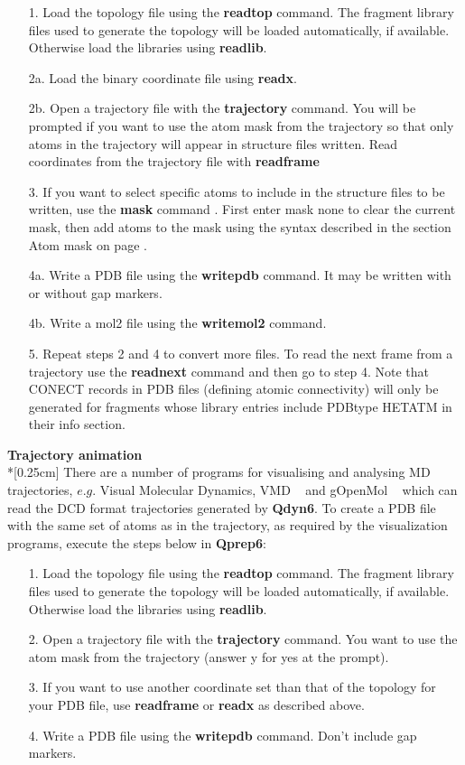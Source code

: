 \documentclass[a4paper,11pt]{article}
\let\origcite\cite
\def\cite#1{\unskip~\origcite{#1}}
\begin{document}
\begin{itemize}
\item[1.] Load the topology file using the \textbf{readtop} command. The fragment
library files used to generate the topology will be loaded
automatically, if available. Otherwise load the libraries using
\textbf{readlib}.
\item[2a.] Load the binary coordinate file using \textbf{readx}.
\item[2b.] Open a trajectory file with the \textbf{trajectory} command. You
will be prompted if you want to use the atom mask from the
trajectory so that only atoms in the trajectory will appear in
structure files written. Read coordinates from the trajectory file
with \textbf{readframe}
\item[3.] If you want to select specific atoms to
include in the structure files to be written, use the
\textbf{mask} command . First enter mask none to clear the current
mask, then add atoms to the mask using the syntax described in the
section Atom mask on page \pageref{subsubsec:atom_masks}.
\item[4a.] Write a PDB file using the \textbf{writepdb} command. It may be written
with or without gap markers.
\item[4b.] Write a mol2 file using the \textbf{writemol2} command.
\item[5.] Repeat steps 2 and 4 to convert more
files. To read the next frame from a trajectory use the
\textbf{readnext} command and then go to step 4. Note that CONECT
records in PDB files (defining atomic connectivity) will only be
generated for fragments whose library entries include PDBtype
HETATM in their info section.
\end{itemize}


\textbf{Trajectory animation}\\*[0.25cm] There are a number of
programs for visualising and analysing MD trajectories, $e.g.$
Visual Molecular Dynamics, VMD \cite{HUMP96, vmdhomepage} and
gOpenMol \cite{Laaksonen1992, gomhomepage} which can read the DCD format
trajectories generated by \textbf{Qdyn6}. To create a PDB file with the same
set of atoms as in the trajectory, as required by the
visualization programs,
execute the steps below in \textbf{Qprep6}:\\

\begin{itemize}
\item[1.] Load the topology file using the \textbf{readtop} command. The
fragment library files used to generate the topology will be
loaded automatically, if available. Otherwise load the libraries
using \textbf{readlib}.
\item[2.] Open a trajectory file with the \textbf{trajectory}
command. You want to use the atom mask from the trajectory (answer
y for yes at the prompt).
\item[3.] If you want to use another
coordinate set than that of the topology for your PDB file, use
\textbf{readframe} or \textbf{readx} as described above.
\item[4.] Write a PDB file using the \textbf{writepdb} command. Don't include gap
markers.
\end{itemize}
\end{document}

